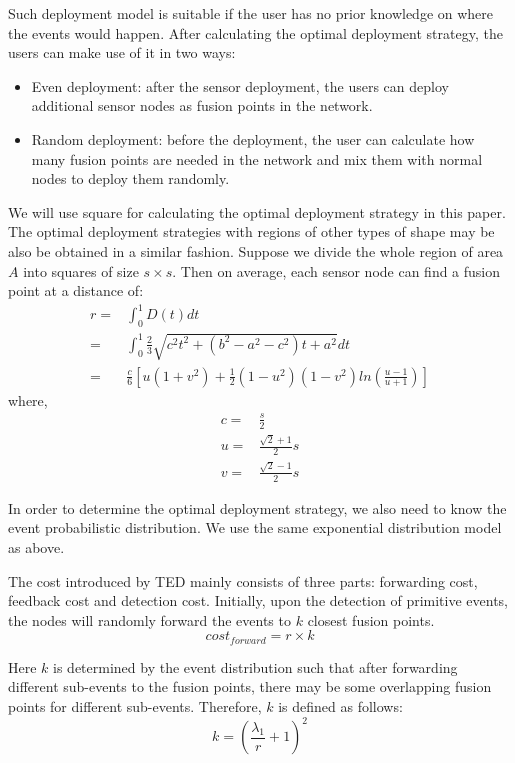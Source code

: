 Such deployment model is suitable if the user has no prior knowledge on where the events would happen. After calculating the optimal deployment strategy, the users can make use of it in two ways:
\begin{itemize}
\item Even deployment: after the sensor deployment, the users can deploy additional sensor nodes as fusion points in the network.
\item Random deployment: before the deployment, the user can calculate how many fusion points are needed in the network and mix them with normal nodes to deploy them randomly.
\end{itemize}

We will use square for calculating the optimal deployment strategy in this paper. The optimal deployment strategies with regions of other types of shape may be also be obtained in a similar fashion. Suppose we divide the whole region of area \(A\) into squares of size \(s\times s\). Then on average, each sensor node can find a fusion point at a distance of:
\begin{align}
r=&\int_0^1D(t)dt\nonumber\\
=&\int_0^1\frac{2}{3}\sqrt{c^2t^2+(b^2-a^2-c^2)t+a^2}dt\nonumber\\
=&\frac{c}{6}[u(1+v^2)+\frac{1}{2}(1-u^2)(1-v^2)ln(\frac{u-1}{u+1})]\label{eq:avgdist1}
\end{align}
where,
\begin{align}
c=&\frac{s}{2}\nonumber\\
u=&\frac{\sqrt{2}+1}{2}s\nonumber\\
v=&\frac{\sqrt{2}-1}{2}s\label{eq:avgdist2}
\end{align}

In order to determine the optimal deployment strategy, we also need to know the event probabilistic distribution. We use the same exponential distribution model as above. %

The cost introduced by TED mainly consists of three parts: forwarding cost, feedback cost and detection cost. Initially, upon the detection of primitive events, the nodes will randomly forward the events to \(k\) closest fusion points. 
\begin{displaymath}
cost_{forward}=r\times k
\end{displaymath}

Here \(k\) is determined by the event distribution such that after forwarding different sub-events to the fusion points, there may be some overlapping fusion points for different sub-events. Therefore, \(k\) is defined as follows:
\begin{equation}
k=(\frac{{\lambda}_1}{r}+1)^2\label{eq:forwardNum}
\end{equation}


